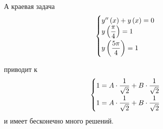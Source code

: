 \documentclass[a5paper,10pt]{article}
\begin{document}
А краевая задача 
$$\begin{cases}
    y''\br{x} + y\br{x} = 0 \\
    y\br{\dfrac {\pi} {4}} = 1 \vspace{0.1cm} \\
    y\br{\dfrac {5\pi} {4}} = 1
\end{cases}$$

приводит к 
$$\begin{cases}
    1 = A \cdot \dfrac {1} {\sqrt{2}} + B \cdot \dfrac {1} {\sqrt{2}} \vspace{0.1cm} \\
    1 = A \cdot \dfrac {1} {\sqrt{2}} + B \cdot \dfrac {1} {\sqrt{2}}
\end{cases}$$
и имеет бесконечно много решений.
\end{document}
